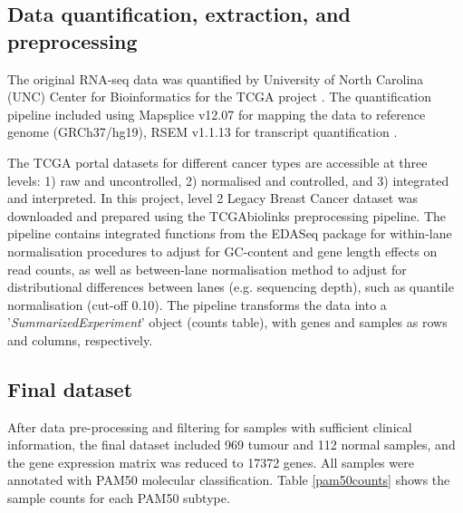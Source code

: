             
    \subsection{Data quantification, extraction, and preprocessing}
    The original RNA-seq data was quantified by University of North Carolina (UNC) Center for Bioinformatics for the TCGA project \cite{UniversityofNorthCarolinaUNCCenterforBioinfromatics2013TCGAData}. The quantification pipeline included  using Mapsplice v12.07 \cite{wang2010mapsplice} for mapping the data to reference genome (GRCh37/hg19), RSEM v1.1.13 \cite{li2011rsem} for transcript quantification \cite{UniversityofNorthCarolinaUNCCenterforBioinfromatics2013TCGAData}. 

    The TCGA portal datasets for different cancer types are accessible at three levels: 1) raw and uncontrolled, 2) normalised and controlled, and 3) integrated and interpreted. In this project, level 2 Legacy Breast Cancer dataset was downloaded and prepared using the TCGAbiolinks preprocessing pipeline. The pipeline contains integrated functions from the EDASeq package \cite{risso2011gc} for within-lane normalisation procedures to adjust for GC-content and gene length effects on read counts, as well as between-lane normalisation method to adjust for distributional differences between lanes (e.g. sequencing depth), such as quantile normalisation (cut-off 0.10)\cite{Colaprico2016, PapaleoTCGAPackages}.  The pipeline transforms the data into a '\textit{SummarizedExperiment}' \cite{Huber2015OrchestratingBioconductor} object (counts table), with genes and samples as rows and columns, respectively. 
    
    
    \subsection{Final dataset}
    
    After data pre-processing and filtering for samples with sufficient clinical information, the final dataset included 969 tumour and 112 normal samples, and  the gene expression matrix was reduced to 17372 genes. 
    All samples were annotated with PAM50 molecular classification. Table \ref{pam50counts} shows the sample counts for each PAM50 subtype. 
    
